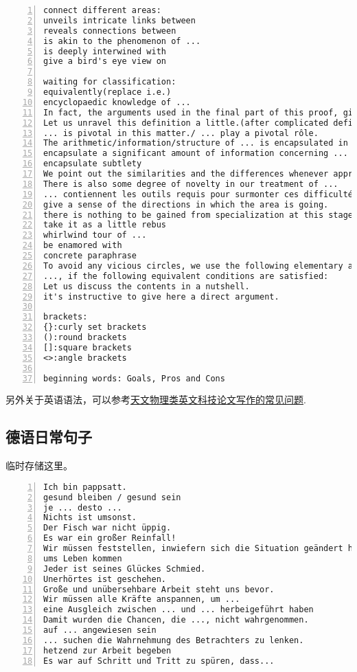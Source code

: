 \documentclass[11pt]{amsart}
\begin{document}
\begin{lstlisting}[numbers=left,numberstyle=\tiny,numbersep=10pt]
connect different areas:
unveils intricate links between
reveals connections between
is akin to the phenomenon of ...
is deeply interwined with
give a bird's eye view on

waiting for classification:
equivalently(replace i.e.)
encyclopaedic knowledge of ...
In fact, the arguments used in the final part of this proof, give the following result.
Let us unravel this definition a little.(after complicated definition)
... is pivotal in this matter./ ... play a pivotal rôle. 
The arithmetic/information/structure of ... is encapsulated in ...
encapsulate a significant amount of information concerning ...
encapsulate subtlety
We point out the similarities and the differences whenever appropriate.
There is also some degree of novelty in our treatment of ...
... contiennent les outils requis pour surmonter ces difficultés.
give a sense of the directions in which the area is going.
there is nothing to be gained from specialization at this stage
take it as a little rebus
whirlwind tour of ...
be enamored with
concrete paraphrase
To avoid any vicious circles, we use the following elementary argument going back to ...
..., if the following equivalent conditions are satisfied:
Let us discuss the contents in a nutshell.
it's instructive to give here a direct argument. 

brackets:
{}:curly set brackets
():round brackets
[]:square brackets
<>:angle brackets

beginning words: Goals, Pros and Cons
\end{lstlisting}

另外关于英语语法，可以参考\href{https://arxiv.org/ftp/arxiv/papers/1011/1011.5973.pdf}{天文物理类英文科技论文写作的常见问题}.
\subsection{德语日常句子}
临时存储这里。
\begin{lstlisting}[numbers=left,numberstyle=\tiny,numbersep=10pt]
Ich bin pappsatt.
gesund bleiben / gesund sein
je ... desto ...
Nichts ist umsonst.
Der Fisch war nicht üppig.
Es war ein großer Reinfall!
Wir müssen feststellen, inwiefern sich die Situation geändert hat.
ums Leben kommen
Jeder ist seines Glückes Schmied.
Unerhörtes ist geschehen.
Große und unübersehbare Arbeit steht uns bevor.
Wir müssen alle Kräfte anspannen, um ...
eine Ausgleich zwischen ... und ... herbeigeführt haben
Damit wurden die Chancen, die ..., nicht wahrgenommen.
auf ... angewiesen sein
... suchen die Wahrnehmung des Betrachters zu lenken.
hetzend zur Arbeit begeben
Es war auf Schritt und Tritt zu spüren, dass...
\end{lstlisting}
\end{document}
